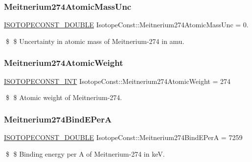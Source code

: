 \subsubsection{\texorpdfstring{Meitnerium274\+Atomic\+Mass\+Unc}{Meitnerium274AtomicMassUnc}}
{\footnotesize\ttfamily \mbox{\hyperlink{group___isotope_const-_macros_ga8f45a7272ce02c0b4c65c44636ed719a}{I\+S\+O\+T\+O\+P\+E\+C\+O\+N\+S\+T\+\_\+\+D\+O\+U\+B\+LE}} Isotope\+Const\+::\+Meitnerium274\+Atomic\+Mass\+Unc = 0.}

\$ \$ Uncertainty in atomic mass of Meitnerium-\/274 in amu. \mbox{\label{group___isotope_const-_meitnerium-_mt274_ga84c91e05d8a47e184ddbd51561fa7746}} 
\subsubsection{\texorpdfstring{Meitnerium274\+Atomic\+Weight}{Meitnerium274AtomicWeight}}
{\footnotesize\ttfamily \mbox{\hyperlink{group___isotope_const-_macros_ga5f18360b3e99483a35c32d789e62621c}{I\+S\+O\+T\+O\+P\+E\+C\+O\+N\+S\+T\+\_\+\+I\+NT}} Isotope\+Const\+::\+Meitnerium274\+Atomic\+Weight = 274}

\$ \$ Atomic weight of Meitnerium-\/274. \mbox{\label{group___isotope_const-_meitnerium-_mt274_gaf105473aefb0959cf1b71a209092b3e3}} 
\subsubsection{\texorpdfstring{Meitnerium274\+Bind\+E\+PerA}{Meitnerium274BindEPerA}}
{\footnotesize\ttfamily \mbox{\hyperlink{group___isotope_const-_macros_ga8f45a7272ce02c0b4c65c44636ed719a}{I\+S\+O\+T\+O\+P\+E\+C\+O\+N\+S\+T\+\_\+\+D\+O\+U\+B\+LE}} Isotope\+Const\+::\+Meitnerium274\+Bind\+E\+PerA = 7259}

\$ \$ Binding energy per A of Meitnerium-\/274 in keV. \mbox{\label{group___isotope_const-_meitnerium-_mt274_ga4e6a7e5e4b7f3f6b26472a22eac33f03}} 
